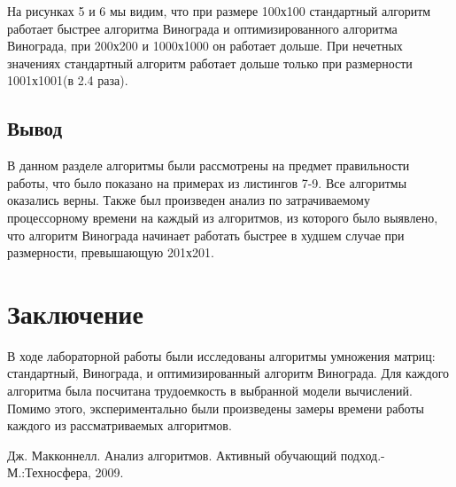 \documentclass[a4paper, 14pt]{article}
\begin{document}
       	
    На рисунках 5 и 6 мы видим, что при размере 100х100 стандартный алгоритм работает быстрее алгоритма Винограда и оптимизированного алгоритма Винограда, при 200х200 и 1000х1000 он работает дольше. При нечетных значениях стандартный алгоритм работает дольше только при размерности 1001х1001(в 2.4 раза). 
	\subsection{Вывод}
	В данном разделе алгоритмы были рассмотрены на предмет правильности работы, что было показано на примерах из листингов 7-9. Все алгоритмы оказались верны. Также был произведен анализ по затрачиваемому процессорному времени на каждый из алгоритмов, из которого было выявлено, что алгоритм Винограда начинает работать быстрее в худшем случае при размерности, превышающую 201х201.
		

    	\newpage
        \section*{Заключение}
        
        В ходе лабораторной работы были исследованы алгоритмы умножения матриц: стандартный, Винограда, и оптимизированный алгоритм Винограда. Для каждого алгоритма была посчитана трудоемкость в выбранной модели вычислений. Помимо этого, экспериментально были произведены замеры времени работы каждого из рассматриваемых алгоритмов. 
        


    \begin{center}
    	\newpage
        
        \begin{thebibliography}{}
      Дж. Макконнелл. Анализ алгоритмов. Активный обучающий подход.-М.:Техносфера, 2009.
\end{thebibliography}
	
	
	
	
        
    \end{center}        
\end{document}
